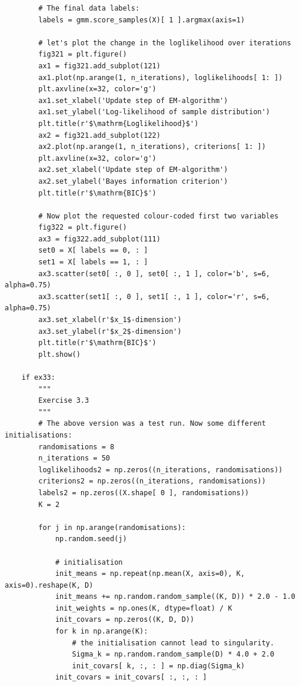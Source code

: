 \begin{verbatim}
        # The final data labels:
        labels = gmm.score_samples(X)[ 1 ].argmax(axis=1)

        # let's plot the change in the loglikelihood over iterations
        fig321 = plt.figure()
        ax1 = fig321.add_subplot(121)
        ax1.plot(np.arange(1, n_iterations), loglikelihoods[ 1: ])
        plt.axvline(x=32, color='g')
        ax1.set_xlabel('Update step of EM-algorithm')
        ax1.set_ylabel('Log-likelihood of sample distribution')
        plt.title(r'$\mathrm{Loglikelihood}$')
        ax2 = fig321.add_subplot(122)
        ax2.plot(np.arange(1, n_iterations), criterions[ 1: ])
        plt.axvline(x=32, color='g')
        ax2.set_xlabel('Update step of EM-algorithm')
        ax2.set_ylabel('Bayes information criterion')
        plt.title(r'$\mathrm{BIC}$')

        # Now plot the requested colour-coded first two variables
        fig322 = plt.figure()
        ax3 = fig322.add_subplot(111)
        set0 = X[ labels == 0, : ]
        set1 = X[ labels == 1, : ]
        ax3.scatter(set0[ :, 0 ], set0[ :, 1 ], color='b', s=6, alpha=0.75)
        ax3.scatter(set1[ :, 0 ], set1[ :, 1 ], color='r', s=6, alpha=0.75)
        ax3.set_xlabel(r'$x_1$-dimension')
        ax3.set_ylabel(r'$x_2$-dimension')
        plt.title(r'$\mathrm{BIC}$')
        plt.show()

    if ex33:
        """
        Exercise 3.3
        """
        # The above version was a test run. Now some different initialisations:
        randomisations = 8
        n_iterations = 50
        loglikelihoods2 = np.zeros((n_iterations, randomisations))
        criterions2 = np.zeros((n_iterations, randomisations))
        labels2 = np.zeros((X.shape[ 0 ], randomisations))
        K = 2

        for j in np.arange(randomisations):
            np.random.seed(j)

            # initialisation
            init_means = np.repeat(np.mean(X, axis=0), K, axis=0).reshape(K, D)
            init_means += np.random.random_sample((K, D)) * 2.0 - 1.0
            init_weights = np.ones(K, dtype=float) / K
            init_covars = np.zeros((K, D, D))
            for k in np.arange(K):
                # the initialisation cannot lead to singularity.
                Sigma_k = np.random.random_sample(D) * 4.0 + 2.0
                init_covars[ k, :, : ] = np.diag(Sigma_k)
            init_covars = init_covars[ :, :, : ]


\end{verbatim}
